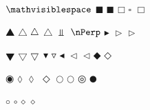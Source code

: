 \documentclass[captions=tableheading]{scrartcl}
\begin{document}
$\mathvisiblespace$
$\mdlgblksquare$ $\blacksquare$
$\mdlgwhtsquare$ $\square$ $\Box$

$\bigblacktriangleup$
$\bigtriangleup$ $\varbigtriangleup$ $\triangle$
$\Perp$
$\nPerp$
$\blacktriangleright$
$\vartriangleright$
$\rhd$

$\bigblacktriangledown$
$\bigtriangledown$ $\varbigtriangledown$
$\blacktriangledown$
$\triangledown$
$\blacktriangleleft$
$\vartriangleleft$
$\lhd$
$\mdlgblkdiamond$
$\mdlgwhtdiamond$

$\fisheye$
$\mdlgwhtlozenge$ $\lozenge$ $\Diamond$
$\mdlgwhtcircle$ $\bigcirc$
$\bullseye$
$\mdlgblkcircle$

$\smwhtcircle$ $\circ$
$\smwhtdiamond$ $\diamond$
\end{document}
